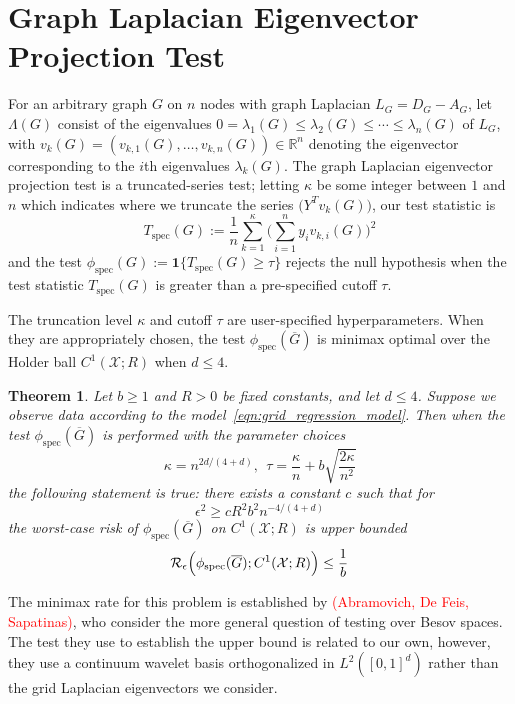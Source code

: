 \documentclass{article}
\newcommand{\Reals}{\mathbb{R}}
\newcommand{\1}{\mathbf{1}}
\newcommand{\Xset}{\mathcal{X}}
\newcommand{\spec}{\mathrm{spec}}
\theoremstyle{alden}
\theoremstyle{aldenthm}
\newtheorem{theorem}{Theorem}
\theoremstyle{definition}
\theoremstyle{remark}
\begin{document}
\section{Graph Laplacian Eigenvector Projection Test}
For an arbitrary graph $G$ on $n$ nodes with graph Laplacian $L_G = D_G - A_G$, let $\Lambda(G)$ consist of the eigenvalues $0 = \lambda_1(G) \leq \lambda_2(G) \leq \cdots \leq \lambda_n(G)$ of $L_G$, with $v_k(G) = (v_{k,1}(G),\ldots,v_{k,n}(G)) \in \Reals^n$ denoting the eigenvector corresponding to the $i$th eigenvalues $\lambda_k(G)$. The graph Laplacian eigenvector projection test is a truncated-series test; letting $\kappa$ be some integer between $1$ and $n$ which indicates where we truncate the series $\bigl(Y^T v_k(G)\bigr)$, our test statistic is
\begin{equation*}
T_{\mathrm{spec}}(G) := \frac{1}{n} \sum_{k = 1}^{\kappa} \Biggl(\sum_{i = 1}^{n} y_i v_{k,i}(G)\Biggr)^2
\end{equation*}
and the test $\phi_{\spec}(G) := \1\{T_{\spec}(G) \geq \tau\}$ rejects the null hypothesis when the test statistic $T_{\mathrm{spec}}(G)$ is greater than a pre-specified cutoff $\tau$. 

The truncation level $\kappa$ and cutoff $\tau$ are user-specified hyperparameters. When they are appropriately chosen, the test $\phi_{\spec}(\overline{G})$ is minimax optimal over the Holder ball $C^{1}(\Xset;R)$ when $d \leq 4$.
\begin{theorem}
	\label{thm:holder_testing_rate_grid}
	Let $b \geq 1$ and $R > 0$ be fixed constants, and let $d \leq 4$. Suppose we observe data according to the model~\eqref{eqn:grid_regression_model}. Then when the test $\phi_{\spec}(\overline{G})$ is performed with the parameter choices
	\begin{equation*}
	\kappa = n^{2d/(4 + d)},~~ \tau = \frac{\kappa}{n} + b\sqrt{\frac{2\kappa}{n^2}}
	\end{equation*}
	the following statement is true: there exists a constant $c$ such that for 
	\begin{equation}
	\label{eqn:holder_testing_rate_grid_1}
	\epsilon^2 \geq c R^2 b^2 n^{-4/(4 + d)}
	\end{equation}
	the worst-case risk of $\phi_{\spec}(\overline{G})$ on $C^{1}(\Xset;R)$ is upper bounded
	\begin{equation}
	\label{eqn:holder_testing_rate_grid_2}
	\mathcal{R}_{\epsilon}\Bigl(\phi_{\spec}(\overline{G});C^{1}(\Xset;R)\Bigr) \leq \frac{1}{b}
	\end{equation}
\end{theorem}
The minimax rate for this problem is established by \textcolor{red}{(Abramovich, De Feis, Sapatinas)}, who consider the more general question of testing over Besov spaces. The test they use to establish the upper bound is related to our own, however, they use a continuum wavelet basis orthogonalized in $L^2([0,1]^d)$ rather than the grid Laplacian eigenvectors we consider. 
\end{document}
